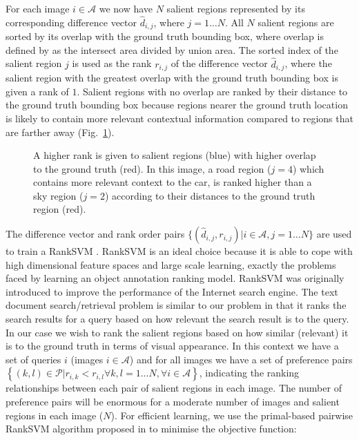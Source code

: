 \documentclass{bmvc2k}
\begin{document}
For each image $i \in \mathcal{A}$ we now have $N$ salient regions represented by its corresponding difference vector $\hat{d}_{i,j}$, where $j=1 \ldots N$.  All $N$ salient regions are sorted by its overlap with the ground truth bounding box, where overlap is defined by \cite{pascalvoc2007} as the intersect area divided by union area. The sorted index of the salient region $j$ is used as the rank $r_{i,j}$ of the difference vector $\hat{d}_{i,j}$, where the salient region with the greatest overlap with the ground truth bounding box is given a rank of $1$. Salient regions with no overlap are ranked by their distance to the ground truth bounding box because regions nearer the ground truth location is likely to contain more relevant contextual information compared to regions that are farther away (Fig.~\ref{fig:transfer_learning}).
\begin{figure}
\begin{center}
\end{center}

\caption{A higher rank is given to salient regions (blue) with higher overlap to the ground truth (red). In this image, a road region ($j=4$) which contains more relevant context to the car, is ranked higher than a sky region ($j=2$) according to their distances to the ground truth region (red).}
\label{fig:transfer_learning}
\end{figure}

The difference vector and rank order pairs $\{(\hat{d}_{i,j},r_{i,j}) | i \in \mathcal{A}, j = 1 \ldots N \}$ are used to train a RankSVM \cite{Joachims_2002}. RankSVM is an ideal choice because it is able to cope with high dimensional feature spaces and large scale learning, exactly the problems faced by learning an object annotation ranking model.
RankSVM was originally introduced to improve the performance of the Internet search engine. The text document search/retrieval problem is similar to our problem in that it ranks the search results for a query based on how relevant the search result is to the query. In our case we wish to rank the salient regions based on how similar (relevant) it is to the ground truth in terms of visual appearance. In this context we have a set of queries $i$ (images $i \in \mathcal{A}$) and for all images we have a set of preference pairs $\left\lbrace (k,l) \in \mathcal{P} | r_{i,k} < r_{i,l} \forall k,l = 1 \ldots N, \forall i \in \mathcal{A} \right\rbrace$, indicating the ranking relationships between each pair of salient regions in each image. The number of preference pairs will be enormous for a moderate number of images and salient regions in each image ($N$). For efficient learning, we use the primal-based pairwise RankSVM algorithm proposed in \cite{Chapelle_2010} to minimise the objective function:
\end{document}
